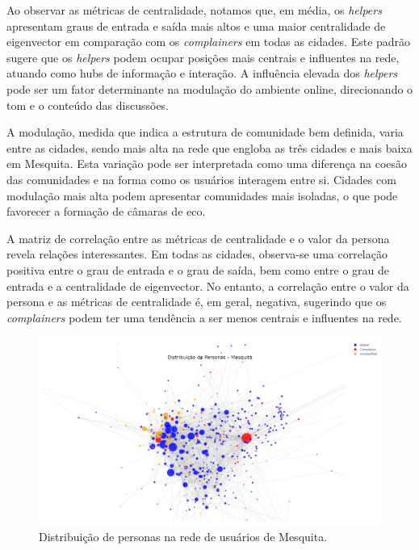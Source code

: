 Ao observar as métricas de centralidade, notamos que, em média, os \textit{helpers} apresentam graus de entrada e saída mais altos e uma maior centralidade de eigenvector em comparação com os \textit{complainers} em todas as cidades. Este padrão sugere que os \textit{helpers} podem ocupar posições mais centrais e influentes na rede, atuando como hubs de informação e interação. A influência elevada dos \textit{helpers} pode ser um fator determinante na modulação do ambiente online, direcionando o tom e o conteúdo das discussões.

A modulação, medida que indica a estrutura de comunidade bem definida, varia entre as cidades, sendo mais alta na rede que engloba as três cidades e mais baixa em Mesquita. Esta variação pode ser interpretada como uma diferença na coesão das comunidades e na forma como os usuários interagem entre si. Cidades com modulação mais alta podem apresentar comunidades mais isoladas, o que pode favorecer a formação de câmaras de eco.

A matriz de correlação entre as métricas de centralidade e o valor da persona revela relações interessantes. Em todas as cidades, observa-se uma correlação positiva entre o grau de entrada e o grau de saída, bem como entre o grau de entrada e a centralidade de eigenvector. No entanto, a correlação entre o valor da persona e as métricas de centralidade é, em geral, negativa, sugerindo que os \textit{complainers} podem ter uma tendência a ser menos centrais e influentes na rede.

\begin{figure}[h]
    \centering
    \includegraphics[width=1\textwidth]{images/network_personas_mesquita.png}
    \caption{Distribuição de personas na rede de usuários de Mesquita.}
    \label{fig:network_personas_mesquita}
\end{figure}

